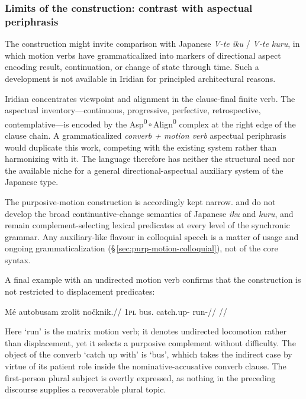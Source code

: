 \subsubsection{Limits of the construction: contrast with aspectual
periphrasis}\label{sec:purp-motion-limits}

The construction might invite comparison with Japanese \textit{V-te iku} /
\textit{V-te kuru}, in which motion verbs have grammaticalized into markers of
directional aspect encoding result, continuation, or change of state through
time. Such a development is not available in Iridian for principled
architectural reasons.

Iridian concentrates viewpoint and alignment in the clause-final finite verb.
The aspectual inventory---continuous, progressive, perfective, retrospective,
contemplative---is encoded by the
Asp\textsuperscript{0}\,$\circ$\,Align\textsuperscript{0} complex at the right
edge of the clause chain. A grammaticalized \textit{converb + motion verb}
aspectual periphrasis would duplicate this work, competing with the existing
system rather than harmonizing with it. The language therefore has neither the
structural need nor the available niche for a general directional-aspectual
auxiliary system of the Japanese type.

The purposive-motion construction is accordingly kept narrow.  and
 do not develop the broad continuative-change semantics of Japanese
\textit{iku} and \textit{kuru}, and remain complement-selecting lexical
predicates at every level of the synchronic grammar. Any auxiliary-like flavour
in colloquial speech is a matter of usage and ongoing grammaticalization
(§\,\ref{sec:purp-motion-colloquial}), not of the core syntax.

A final example with an undirected motion verb confirms that the construction is
not restricted to displacement predicates:

\ex\label{ex:purp-run}
\begingl
\gla Mé autobusam zrolit nočknik.//
\glb \textsc{1pl} bus.\Ind{} catch.up-\Purp{} run-\Pf{}//
\glft {}//
\endgl
\xe

Here  `run' is the matrix motion verb; it denotes undirected
locomotion rather than displacement, yet it selects a purposive complement
without difficulty. The object of the converb  `catch up with' is
 `bus', whhich takes the indirect case by virtue of its patient
role inside the nominative-accusative converb clause. The first-person plural
subject  is overtly expressed, as nothing in the preceding discourse
supplies a recoverable plural topic.

